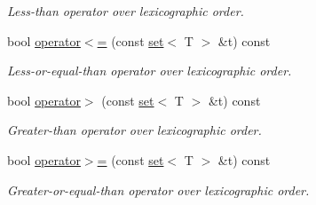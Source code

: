 \begin{DoxyCompactItemize}
\begin{DoxyCompactList}\small\item\em Less-\/than operator over lexicographic order. \end{DoxyCompactList}\item 
bool \hyperlink{classmerlin_1_1set_acd79b5291a0c3eff64f993cf25031418}{operator$<$=} (const \hyperlink{classmerlin_1_1set}{set}$<$ T $>$ \&t) const \hypertarget{classmerlin_1_1set_acd79b5291a0c3eff64f993cf25031418}{}\label{classmerlin_1_1set_acd79b5291a0c3eff64f993cf25031418}

\begin{DoxyCompactList}\small\item\em Less-\/or-\/equal-\/than operator over lexicographic order. \end{DoxyCompactList}\item 
bool \hyperlink{classmerlin_1_1set_a8fc807637ddc148480a9d155b2f6998f}{operator$>$} (const \hyperlink{classmerlin_1_1set}{set}$<$ T $>$ \&t) const \hypertarget{classmerlin_1_1set_a8fc807637ddc148480a9d155b2f6998f}{}\label{classmerlin_1_1set_a8fc807637ddc148480a9d155b2f6998f}

\begin{DoxyCompactList}\small\item\em Greater-\/than operator over lexicographic order. \end{DoxyCompactList}\item 
bool \hyperlink{classmerlin_1_1set_a27f64ae1e7ad2e08df34a5dbed0a4d26}{operator$>$=} (const \hyperlink{classmerlin_1_1set}{set}$<$ T $>$ \&t) const \hypertarget{classmerlin_1_1set_a27f64ae1e7ad2e08df34a5dbed0a4d26}{}\label{classmerlin_1_1set_a27f64ae1e7ad2e08df34a5dbed0a4d26}

\begin{DoxyCompactList}\small\item\em Greater-\/or-\/equal-\/than operator over lexicographic order. \end{DoxyCompactList}\end{DoxyCompactItemize}
